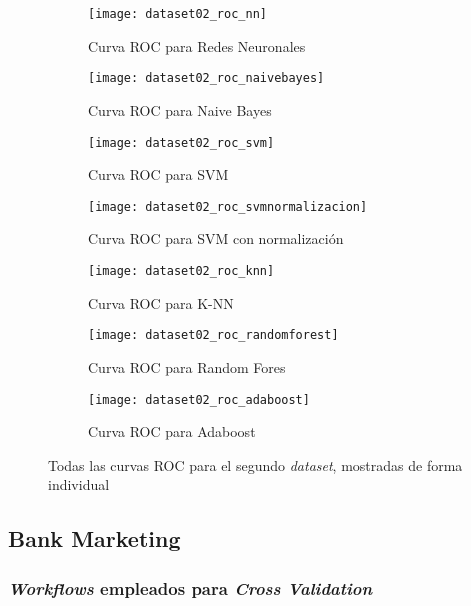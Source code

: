 \documentclass[11pt]{article}
\begin{document}
\begin{figure}[H]
    \centering

    \begin{subfigure}[b]{0.4 \textwidth}
        \texttt{[image: dataset02\_roc\_nn]}
        \caption{Curva ROC para Redes Neuronales}
    \end{subfigure}
    \begin{subfigure}[b]{0.4 \textwidth}
        \texttt{[image: dataset02\_roc\_naivebayes]}
        \caption{Curva ROC para Naive Bayes}
    \end{subfigure}

    \begin{subfigure}[b]{0.4 \textwidth}
        \texttt{[image: dataset02\_roc\_svm]}
        \caption{Curva ROC para SVM}
    \end{subfigure}
    \begin{subfigure}[b]{0.4 \textwidth}
        \texttt{[image: dataset02\_roc\_svmnormalizacion]}
        \caption{Curva ROC para SVM con normalización}
    \end{subfigure}

    \begin{subfigure}[b]{0.4 \textwidth}
        \texttt{[image: dataset02\_roc\_knn]}
        \caption{Curva ROC para K-NN}
    \end{subfigure}
    \begin{subfigure}[b]{0.4 \textwidth}
        \texttt{[image: dataset02\_roc\_randomforest]}
        \caption{Curva ROC para Random Fores}
    \end{subfigure}

    \begin{subfigure}[b]{0.4 \textwidth}
        \texttt{[image: dataset02\_roc\_adaboost]}
        \caption{Curva ROC para Adaboost}
    \end{subfigure}

    \caption{Todas las curvas ROC para el segundo \emph{dataset}, mostradas de forma individual}
\end{figure}

\pagebreak

\subsection{Bank Marketing}

\subsubsection{\emph{Workflows} empleados para \emph{Cross Validation}}
\end{document}
